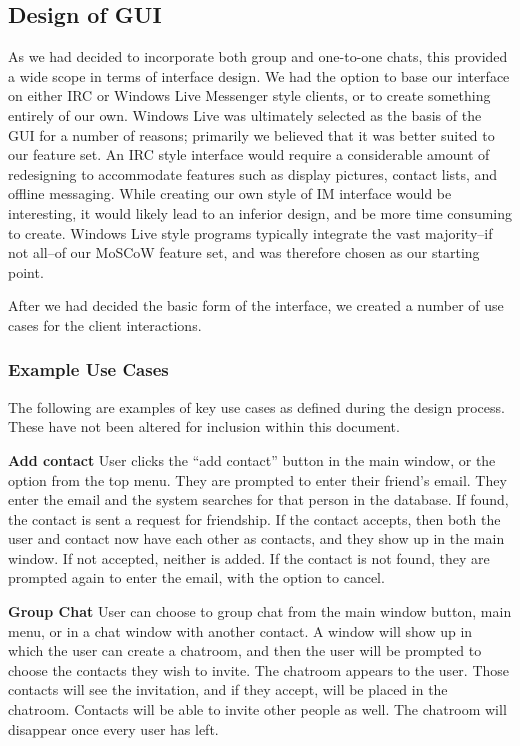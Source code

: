 \subsection{Design of GUI}

As we had decided to incorporate both group and one-to-one chats, this provided a wide scope in terms of interface design. We had the option to base our interface on either IRC or Windows Live Messenger style clients, or to create something entirely of our own. Windows Live was ultimately selected as the basis of the GUI for a number of reasons; primarily we believed that it was better suited to our feature set. An IRC style interface would require a considerable amount of redesigning to accommodate features such as display pictures, contact lists, and offline messaging. While creating our own style of IM interface would be interesting, it would likely lead to an inferior design, and be more time consuming to create. Windows Live style programs typically integrate the vast majority--if not all--of our MoSCoW feature set, and was therefore chosen as our starting point.
 
After we had decided the basic form of the interface, we created a number of use cases for the client interactions.

\subsubsection{Example Use Cases}

The following are examples of key use cases as defined during the design process. These have not been altered for inclusion within this document.

{\bf Add contact}
User clicks the ``add contact'' button in the main window, or the option from the top menu. They are prompted to enter their friend's email. They enter the email and the system searches for that person in the database. If found, the contact is sent a request for friendship. If the contact accepts, then both the user and contact now have each other as contacts, and they show up in the main window. If not accepted, neither is added. If the contact is not found, they are prompted again to enter the email, with the option to cancel.

{\bf Group Chat}
User can choose to group chat from the main window button, main menu, or in a chat window with another contact. A window will show up in which the user can create a chatroom, and then the user will be prompted to choose the contacts they wish to invite. The chatroom appears to the user. Those contacts will see the invitation, and if they accept, will be placed in the chatroom. Contacts will be able to invite other people as well. The chatroom will disappear once every user has left.

